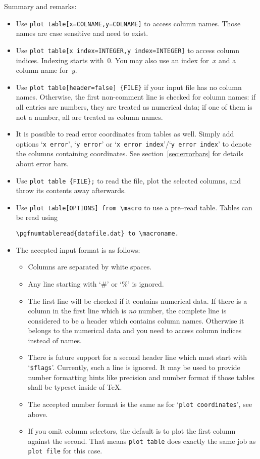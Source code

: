 Summary and remarks:
\begin{itemize}
	\item Use \texttt{plot table[x=COLNAME,y=COLNAME]} to access column names. Those names are case sensitive and need to exist.
	\item Use \texttt{plot table[x index=INTEGER,y index=INTEGER]} to access column indices. Indexing starts with~$0$. You may also use an index for~$x$ and a column name for~$y$.
	\item Use \lstinline!plot table[header=false] {FILE}! if your input file has no column names. Otherwise, the first non-comment line is checked for column names: if all entries are numbers, they are treated as numerical data; if one of them is not a number, all are treated as column names.
	\item It is possible to read error coordinates from tables as well. Simply add options `\texttt{x error}', `\texttt{y error}' or `\texttt{x error index}'/`\texttt{y error index}' to denote the columns containing coordinates. See section~\ref{sec:errorbars} for details about error bars.
	\item Use \lstinline!plot table {FILE};! to read the file, plot the selected columns, and throw its contents away afterwards.
	\item Use \lstinline!plot table[OPTIONS] from \macro! to use a pre--read table. Tables can be read using
\begin{lstlisting}
\pgfnumtableread{datafile.dat} to \macroname.
\end{lstlisting}
	\item The accepted input format is as follows:
		\begin{itemize}
			\item Columns are separated by white spaces.
			\item Any line starting with `\#' or `\%' is ignored.
			\item The first line will be checked if it contains numerical data. If there is a column in the first line which is \emph{no} number, the complete line is considered to be a header which contains column names. Otherwise it belongs to the numerical data and you need to access column indices instead of names.

			\item There is future support for a second header line which must start with `\texttt{\$flags}'. Currently, such a line is ignored. It may be used to provide number formatting hints like precision and number format if those tables shall be typeset inside of \TeX.
			\item The accepted number format is the same as for `\texttt{plot coordinates}', see above.
			\item If you omit column selectors, the default is to plot the first column against the second. That means \texttt{plot table} does exactly the same job as \texttt{plot file} for this case.
		\end{itemize}
\end{itemize}

